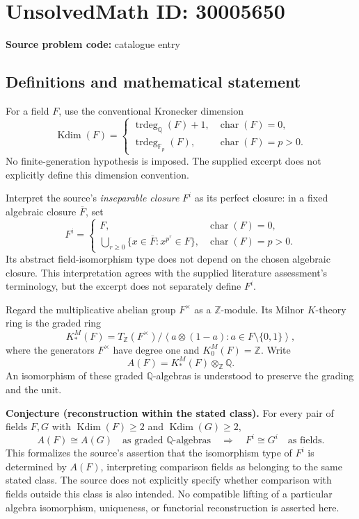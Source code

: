 \documentclass[11pt]{article}
\newcommand{\Z}{\mathbb{Z}}
\newcommand{\Q}{\mathbb{Q}}
\newcommand{\F}{\mathbb{F}}
\begin{document}
\section*{UnsolvedMath ID: 30005650}
\textbf{Source problem code:} catalogue entry
\subsection{Definitions and mathematical statement}
For a field \(F\), use the conventional Kronecker dimension
\[
\operatorname{Kdim}(F)=
\begin{cases}
\operatorname{trdeg}_{\Q}(F)+1,&\operatorname{char}(F)=0,\\
\operatorname{trdeg}_{\F_p}(F),&\operatorname{char}(F)=p>0.
\end{cases}
\]
No finite-generation hypothesis is imposed. The supplied excerpt does not explicitly define this dimension convention.

Interpret the source's \emph{inseparable closure} \(F^i\) as its perfect closure: in a fixed algebraic closure \(\overline F\), set
\[
F^i=\begin{cases}
F,&\operatorname{char}(F)=0,\\
\displaystyle\bigcup_{r\geq 0}\{x\in\overline F:x^{p^r}\in F\},&\operatorname{char}(F)=p>0.
\end{cases}
\]
Its abstract field-isomorphism type does not depend on the chosen algebraic closure. This interpretation agrees with the supplied literature assessment's terminology, but the excerpt does not separately define \(F^i\).

Regard the multiplicative abelian group \(F^\times\) as a \(\Z\)-module. Its Milnor \(K\)-theory ring is the graded ring
\[
K_*^M(F)=T_{\Z}(F^\times)\big/\left\langle a\otimes(1-a):a\in F\setminus\{0,1\}\right\rangle,
\]
where the generators \(F^\times\) have degree one and \(K_0^M(F)=\Z\). Write
\[
A(F)=K_*^M(F)\otimes_{\Z}\Q.
\]
An isomorphism of these graded \(\Q\)-algebras is understood to preserve the grading and the unit.

\textbf{Conjecture (reconstruction within the stated class).} For every pair of fields \(F,G\) with \(\operatorname{Kdim}(F)\geq 2\) and \(\operatorname{Kdim}(G)\geq 2\),
\[
A(F)\cong A(G)\quad\text{as graded \(\Q\)-algebras}
\quad\Longrightarrow\quad
F^i\cong G^i\quad\text{as fields}.
\]
This formalizes the source's assertion that the isomorphism type of \(F^i\) is determined by \(A(F)\), interpreting comparison fields as belonging to the same stated class. The source does not explicitly specify whether comparison with fields outside this class is also intended. No compatible lifting of a particular algebra isomorphism, uniqueness, or functorial reconstruction is asserted here.
\end{document}
